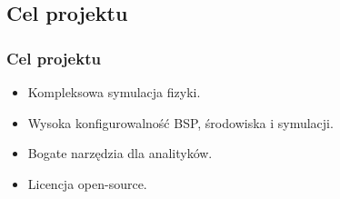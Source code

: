 \documentclass[aspectratio=169]{beamer}
\begin{document}
\begin{frame}
\begin{columns}
\begin{column}{0.33\textwidth}
\begin{figure}
	    		\end{figure}
		\end{column}
		\begin{column}{0.33\textwidth}
	    		\begin{figure}
	   		 \centering
	    		\end{figure}
		\end{column}
	\end{columns}
	\begin{figure}
		\hfill
	\end{figure}
\end{frame}

\subsection{Cel projektu}
\begin{frame}%
	\frametitle{Cel projektu}
	  \begin{itemize}
	  \item {
	    Kompleksowa symulacja fizyki.
	    \pause %
	  }
	  \item {   
	    Wysoka konfigurowalność BSP, środowiska i symulacji.
	  }
	  \item<3-> {
	    Bogate narzędzia dla analityków.
	  }
	  \item<4-> {
	    Licencja open-source.
	  }
 	 \end{itemize}
\end{frame}
\end{document}
